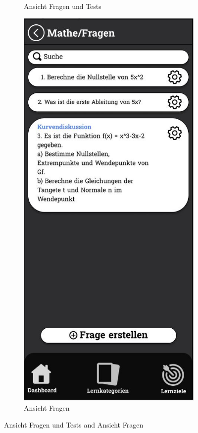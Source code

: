 \begin{figure}[htbp]
\begin{subfigure}[b]{0.45\linewidth}
    \caption{Ansicht Fragen und Tests}
    \label{fig:fragen-tests-ansicht}
  \end{subfigure}
  \hfill
  \begin{subfigure}[b]{0.45\linewidth}
    \centering
    \includegraphics[width=\linewidth]{images/Mockups/Fragen.JPG}
    \caption{Ansicht Fragen}
    \label{fig:fragen-ansicht}
  \end{subfigure}
  \caption{Ansicht Fragen und Tests and Ansicht Fragen}
  \label{fig:fragen-tests}
\end{figure}

